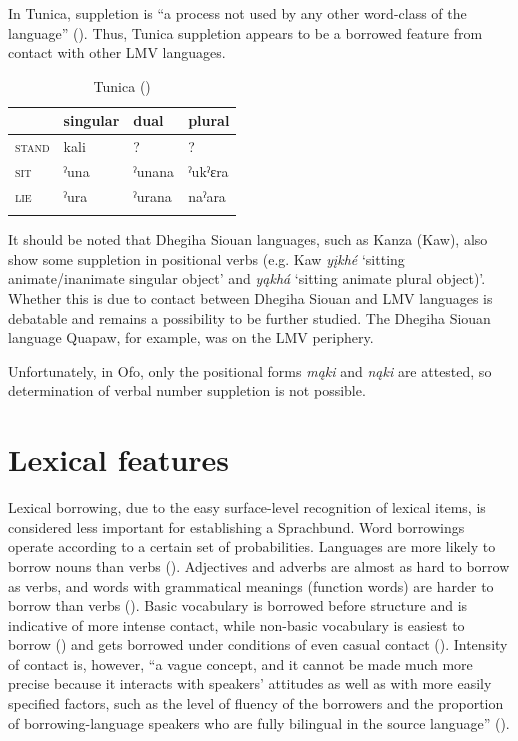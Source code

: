 \documentclass[output=paper]{LSP/langsci}
\begin{document}
In Tunica, suppletion is “a process not used by any other word-class of the language” (\citealt[40]{Haas1946}). Thus, Tunica suppletion appears to be a borrowed feature from contact with other LMV languages.

\begin{table}
\caption{Tunica (\citealt[40]{Haas1946})}
\begin{tabularx}{.75\textwidth}{XXXX}
\lsptoprule
&  {singular} &  {dual} &  {plural} \\
\midrule
 \textsc{stand} & kali\footnotemark & ? & ? \\
\textsc{sit} & ˀuna & ˀunana & ˀukˀɛra \\
\textsc{lie} & ˀura & ˀurana & naˀara \\
\lspbottomrule
\end{tabularx} 
\end{table}

	It should be noted that Dhegiha Siouan languages, such as Kanza (Kaw), also show some suppletion in positional verbs (e.g. Kaw \emph{yįkhé} `sitting animate/inanimate singular object' and \emph{yąkhá} `sitting animate plural object)'. Whether this is due to contact between Dhegiha Siouan and LMV languages is debatable and remains a possibility to be further studied. The Dhegiha Siouan language Quapaw, for example, was on the LMV periphery.

Unfortunately, in Ofo, only the positional forms \emph{mąki} and \emph{nąki} are attested, so determination of verbal number suppletion is not possible.

\section{Lexical features}

	Lexical borrowing, due to the easy surface-level recognition of lexical items, is considered less important for establishing a Sprachbund. Word borrowings operate according to a certain set of probabilities. Languages are more likely to borrow nouns than verbs (\citealt[231]{Tadmoretal2010}). Adjectives and adverbs are almost as hard to borrow as verbs, and words with grammatical meanings (function words) are harder to borrow than verbs (\citealt[231]{Tadmoretal2010}). Basic vocabulary is borrowed before structure and is indicative of more intense contact, while non-basic vocabulary is easiest to borrow (\citealt[69]{Thomason2001}) and gets borrowed under conditions of even casual contact (\citealt[231]{Tadmoretal2010}). Intensity of contact is, however, “a vague concept, and it cannot be made much more precise because it interacts with speakers’ attitudes as well as with more easily specified factors, such as the level of fluency of the borrowers and the proportion of borrowing-language speakers who are fully bilingual in the source language” (\citealt[231]{Tadmoretal2010}). 
\end{document}
